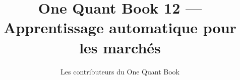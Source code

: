 \documentclass[11pt,a4paper,twoside,openany]{book}
\title{One Quant Book 12 --- Apprentissage automatique pour les marchés}
\author{Les contributeurs du One Quant Book}
\date{\bookdate}
\begin{document}
\frontmatter



\tableofcontents

\mainmatter


\appendix
\part{\omsolutionspart}


\backmatter
\printindex
\end{document}
